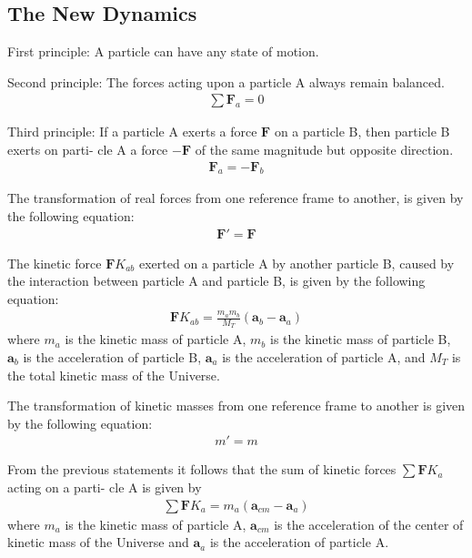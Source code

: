 \documentclass[12pt]{article}
\newcommand{\yN}{\newpage}%
\newcommand{\yS}{\medskip}%
\newcommand{\cA}{\centering}%
\newcommand{\cS}{\cA\subsection}%
\newcommand{\cs}[1]{}%
\newcommand{\vA}{\mathbf{a}}
\newcommand{\vF}{\mathbf{F}}
\newcommand{\nK}{{\scriptstyle K}}
\newcommand{\mM}{m}
\newcommand{\mN}{M}
\newcommand{\rt}{'}
\newcommand{\rT}{_T}
\newcommand{\ra}{_a}
\newcommand{\rb}{_b}
\newcommand{\rab}{_{ab}}
\newcommand{\rcm}{_{cm}}
\begin{document}
\yS \vspace{-1.2em}

{\cs{The New Dynamics}}
{\cS{The New Dynamics}}

\par First principle: A particle can have any state of motion.
\par Second principle: The forces acting upon a particle A always remain balanced.
\begin{eqnarray*}
\sum \vF\ra = 0
\end{eqnarray*}
\par Third principle: If a particle A exerts a force $\vF$ on a particle B, then particle B exerts on parti- cle A a force $-\vF$ of the same magnitude but opposite direction.
\begin{eqnarray*}
\vF\ra = -\vF\rb
\end{eqnarray*}
\par The transformation of real forces from one reference frame to another, is given by the following equation:
\begin{eqnarray*}
\vF\rt = \vF
\end{eqnarray*}

\yN \baselineskip=14.5pt \enlargethispage{0em}

\par The kinetic force $\vF\nK\rab$ exerted on a particle A by another particle B, caused by the interaction between particle A and particle B, is given by the following equation:
\begin{eqnarray*}
\vF\nK\rab = \frac{\mM\ra\mM\rb}{\mN\rT}(\vA\rb - \vA\ra)
\end{eqnarray*}
\noindent where $\mM\ra$ is the kinetic mass of particle A, $\mM\rb$ is the kinetic mass of particle B, $\vA\rb$ is the acceleration of particle B, $\vA\ra$ is the acceleration of particle A, and $\mN\rT$ is the total kinetic mass of the Universe.
\par The transformation of kinetic masses from one reference frame to another is given by the following equation:
\begin{eqnarray*}
\mM\rt = \mM
\end{eqnarray*}
\par From the previous statements it follows that the sum of kinetic forces $\sum \vF\nK\ra$ acting on a parti- cle A is given by
\begin{eqnarray}
\sum \vF\nK\ra = \mM\ra(\vA\rcm - \vA\ra) \label{e14}
\end{eqnarray}
\noindent where $\mM\ra$ is the kinetic mass of particle A, $\vA\rcm$ is the acceleration of the center of kinetic mass of the Universe and $\vA\ra$ is the acceleration of particle A.
\end{document}
